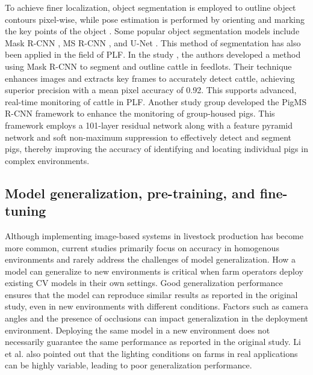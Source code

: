 To achieve finer localization, object segmentation is employed to outline object contours pixel-wise, while pose estimation is performed by orienting and marking the key points of the object \cite{hariharan2015hypercolumns}. Some popular object segmentation models include Mask R-CNN \cite{he2017mask}, MS R-CNN \cite{huang2019mask}, and U-Net \cite{siddique2021u}. This method of segmentation has also been applied in the field of PLF. In the study \cite{noe2022automatic}, the authors developed a method using Mask R-CNN \cite{he2017mask} to segment and outline cattle in feedlots. Their technique enhances images and extracts key frames to accurately detect cattle, achieving superior precision with a mean pixel accuracy of 0.92. This supports advanced, real-time monitoring of cattle in PLF. Another study group \cite{tu2021automatic} developed the PigMS R-CNN framework \cite{huang2019mask} to enhance the monitoring of group-housed pigs. This framework employs a 101-layer residual network along with a feature pyramid network and soft non-maximum suppression to effectively detect and segment pigs, thereby improving the accuracy of identifying and locating individual pigs in complex environments.

\subsection*{Model generalization, pre-training, and fine-tuning}

Although implementing image-based systems in livestock production has become more common, current studies primarily focus on accuracy in homogenous environments and rarely address the challenges of model generalization. How a model can generalize to new environments is critical when farm operators deploy existing CV models in their own settings. Good generalization performance ensures that the model can reproduce similar results as reported in the original study, even in new environments with different conditions. Factors such as camera angles and the presence of occlusions can impact generalization in the deployment environment. Deploying the same model in a new environment does not necessarily guarantee the same performance as reported in the original study. Li et al. \cite{li2021practices} also pointed out that the lighting conditions on farms in real applications can be highly variable, leading to poor generalization performance.

